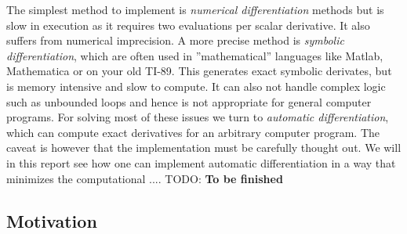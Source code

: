 	The simplest method to implement is \textit{numerical differentiation} methods 
	but is slow in execution as it requires two evaluations per scalar derivative. 
	It also suffers from numerical imprecision. A more precise method is 
	\textit{symbolic differentiation}, which are often used in  ''mathematical''
	languages
	like Matlab, Mathematica or on your old TI-89.  This generates exact symbolic
	derivates, but 
	is memory intensive and slow to compute. It can also not handle 
	complex logic such as unbounded loops and hence is not appropriate for general
	computer programs. 
	For solving most of these issues we turn to \textit{automatic differentiation},
	which can 
	compute exact derivatives for an arbitrary computer program. The caveat is
	however 
	that the implementation must be carefully thought out. We will in this report
	see how one can implement automatic differentiation in a way that minimizes 
	the computational ....
	TODO: \textbf{To be finished}
	\subsection{Motivation}
	
	
